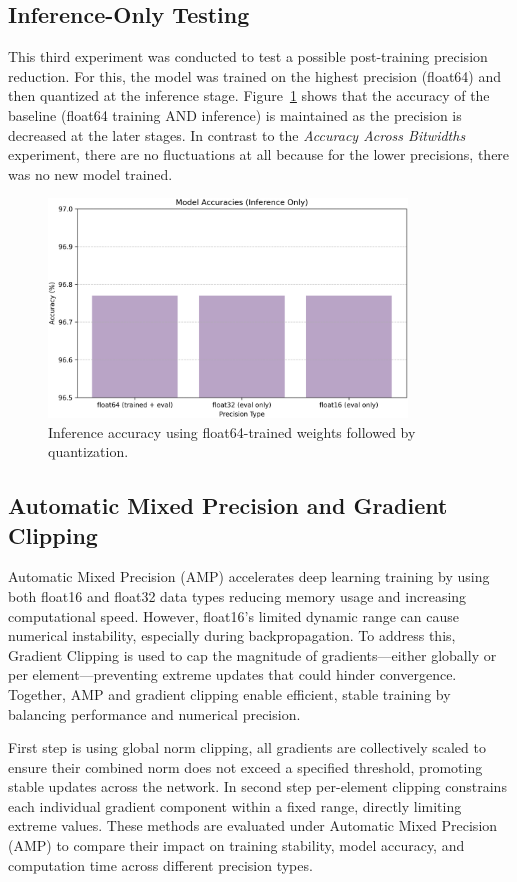 \documentclass[11pt]{article}
\begin{document}
\subsection*{Inference-Only Testing}
This third experiment was conducted to test a possible post-training precision
reduction. For this, the model was trained on the highest precision (float64)
and then quantized at the inference stage.
Figure~\ref{fig:inferenceOnlyTesting} shows that the accuracy of the baseline
(float64 training AND inference) is maintained as the precision is decreased at
the later stages. In contrast to the \textit{Accuracy Across Bitwidths}
experiment, there are no fluctuations at all because for the lower precisions,
there was no new model trained.
\begin{figure}[H]
	\centering
	\includegraphics[width=0.85\textwidth]{figures/inferenceOnly.png}
	\caption{Inference accuracy using float64-trained weights followed by quantization.}\label{fig:inferenceOnlyTesting}
\end{figure}

\subsection*{Automatic Mixed Precision and Gradient Clipping}
Automatic Mixed Precision (AMP) accelerates deep learning training by using both float16
and float32 data types reducing memory usage and increasing computational speed. 
However, float16’s limited dynamic range can cause numerical instability,
especially during backpropagation. To address this, Gradient Clipping is used to cap 
the magnitude of gradients—either globally or per element—preventing extreme updates
that could hinder convergence. Together, AMP and gradient clipping enable efficient,
stable training by balancing performance and numerical precision.

First step is using global norm clipping, all gradients are collectively scaled to ensure
their combined norm does not exceed a specified threshold, promoting stable updates
across the network. In second step per-element clipping constrains each individual gradient
component within a fixed range, directly limiting extreme values.
These methods are evaluated under Automatic Mixed Precision (AMP) to compare their impact on
training stability, model accuracy, and computation time across different precision types.
\end{document}
